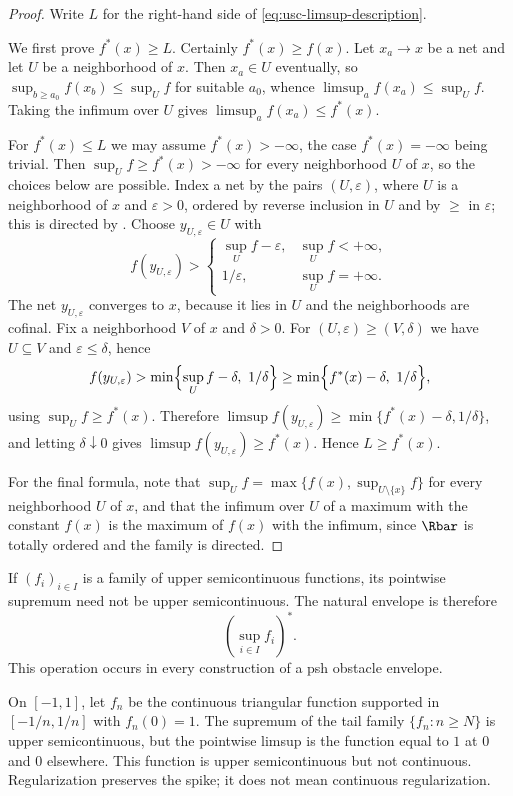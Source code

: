 \begin{proof}
Write $L$ for the right-hand side of \eqref{eq:usc-limsup-description}.

We first prove $f^*(x)\geq L$.  Certainly $f^*(x)\geq f(x)$.  Let $x_a\to x$
be a net and let $U$ be a neighborhood of $x$.  Then $x_a\in U$ eventually, so
$\sup_{b\geq a_0}f(x_b)\leq\sup_Uf$ for suitable $a_0$, whence
$\limsup_af(x_a)\leq\sup_Uf$.  Taking the infimum over $U$ gives
$\limsup_af(x_a)\leq f^*(x)$.

For $f^*(x)\leq L$ we may assume $f^*(x)>-\infty$, the case
$f^*(x)=-\infty$ being trivial.  Then $\sup_Uf\geq f^*(x)>-\infty$ for every
neighborhood $U$ of $x$, so the choices below are possible.  Index a net by
the pairs $(U,\varepsilon)$, where $U$ is a neighborhood of $x$ and
$\varepsilon>0$, ordered by reverse inclusion in $U$ and by $\geq$ in
$\varepsilon$; this is directed by
.  Choose
$y_{U,\varepsilon}\in U$ with
\[
 f(y_{U,\varepsilon})>
 \begin{cases}
 \sup_Uf-\varepsilon, & \sup_Uf<+\infty,\\
 1/\varepsilon, & \sup_Uf=+\infty .
 \end{cases}
\]
The net $y_{U,\varepsilon}$ converges to $x$, because it
lies in $U$ and the neighborhoods are cofinal.  Fix a neighborhood $V$ of $x$
and $\delta>0$.  For $(U,\varepsilon)\geq(V,\delta)$ we have $U\subseteq V$
and $\varepsilon\leq\delta$, hence
\[
 f(y_{U,\varepsilon})>\min\Bigl\{\sup_Uf-\delta,\ 1/\delta\Bigr\}
 \geq\min\Bigl\{f^*(x)-\delta,\ 1/\delta\Bigr\},
\]
using $\sup_Uf\geq f^*(x)$.  Therefore
$\limsup f(y_{U,\varepsilon})\geq\min\{f^*(x)-\delta,1/\delta\}$, and letting
$\delta\downarrow0$ gives $\limsup f(y_{U,\varepsilon})\geq f^*(x)$.  Hence
$L\geq f^*(x)$.

For the final formula, note that $\sup_Uf=\max\{f(x),\sup_{U\setminus\{x\}}f\}$
for every neighborhood $U$ of $x$, and that the infimum over $U$ of a maximum
with the constant $f(x)$ is the maximum of $f(x)$ with the infimum, since
$\Rbar$ is totally ordered and the family is directed.
\end{proof}

If $(f_i)_{i\in I}$ is a family of upper semicontinuous functions, its
pointwise supremum need not be upper semicontinuous.  The natural envelope is
therefore
\[
                       \left(\sup_{i\in I}f_i\right)^*.
\]
This operation occurs in every construction of a psh obstacle envelope.

\begin{example}
\label{ex:usc-spike-regularization}
On $[-1,1]$, let $f_n$ be the continuous triangular function supported in
$[-1/n,1/n]$ with $f_n(0)=1$.  The supremum of the tail family
$\{f_n:n\geq N\}$ is upper semicontinuous, but the pointwise limsup is the
function equal to $1$ at $0$ and $0$ elsewhere.  This function is upper
semicontinuous but not continuous.  Regularization preserves the spike; it
does not mean continuous regularization.
\end{example}

